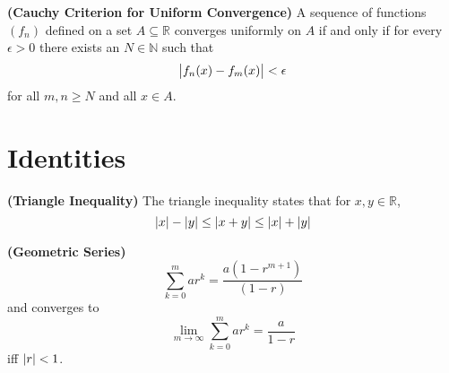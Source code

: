 \begin{theorem}
  \textbf{\textup{(Cauchy Criterion for Uniform Convergence)}}
  A sequence of functions $(f_n)$ deﬁned on a set $A \subseteq \mathbb{R}$
  converges uniformly on $A$ if and only if for every 
  $\epsilon>0$ there exists an $N \in \mathbb{N}$
  such that 
  \begin{equation*}
    \abs{
      f_n(x) - f_m(x)
    } < \epsilon
  \end{equation*}
  for all $m,n \geq N$ and all $x \in A$.
\end{theorem}

\section{Identities}
\begin{identity}
  \textbf{\textup{(Triangle Inequality)}}
  The triangle inequality states that for $x, y \in \mathbb{R}$,
  \begin{equation}
    \abs{x} - \abs{y} \leq \abs{x + y} \leq \abs{x} + \abs{y}
  \end{equation}
\end{identity}

\begin{identity}
  \textbf{\textup{(Geometric Series)}}
  \begin{equation}
    \sum_{k=0}^m ar^k = \frac{a(1-r^{m+1})}{(1-r)}
    \label{eq:geometric_series}
  \end{equation}
  and converges to 
  \begin{equation*}
    \lim_{m\to\infty} \sum_{k=0}^m ar^k = \frac{a}{1-r}
  \end{equation*}
  iff $\abs{r} < 1$.
\end{identity}